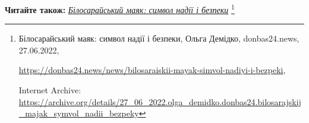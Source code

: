  
 
 
 
 


\textbf{Читайте також:} \href{https://archive.org/details/27_06_2022.olga_demidko.donbas24.bilosarajskij_majak_symvol_nadii_bezpeky}{\emph{Білосарайський маяк: символ надії і безпеки}}%
\footnote{Білосарайський маяк: символ надії і безпеки, Ольга Демідко, donbas24.news, 27.06.2022, \par%
\url{https://donbas24.news/news/bilosaraiskii-mayak-simvol-nadiyi-i-bezpeki}, \par%
Internet Archive: \url{https://archive.org/details/27_06_2022.olga_demidko.donbas24.bilosarajskij_majak_symvol_nadii_bezpeky}%
}
